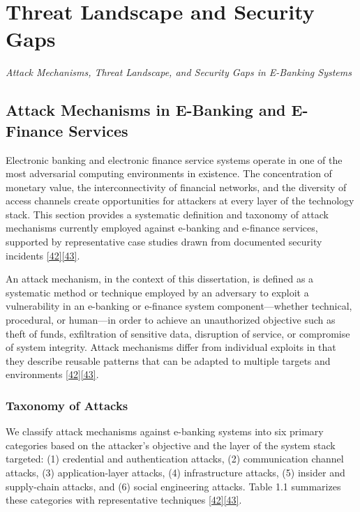 \chapter{Threat Landscape and Security Gaps}
\label{ch:chapter01}

\noindent\textit{Attack Mechanisms, Threat Landscape, and Security Gaps in E-Banking Systems}\par\vspace{1em}

\section{Attack Mechanisms in E-Banking and E-Finance Services}

\indent Electronic banking and electronic finance service systems operate in one of the most adversarial computing environments in existence. The concentration of monetary value, the interconnectivity of financial networks, and the diversity of access channels create opportunities for attackers at every layer of the technology stack. This section provides a systematic definition and taxonomy of attack mechanisms currently employed against e-banking and e-finance services, supported by representative case studies drawn from documented security incidents \hyperref[ref:42]{[42]}\hyperref[ref:43]{[43]}.

\indent An attack mechanism, in the context of this dissertation, is defined as a systematic method or technique employed by an adversary to exploit a vulnerability in an e-banking or e-finance system component---whether technical, procedural, or human---in order to achieve an unauthorized objective such as theft of funds, exfiltration of sensitive data, disruption of service, or compromise of system integrity. Attack mechanisms differ from individual exploits in that they describe reusable patterns that can be adapted to multiple targets and environments \hyperref[ref:42]{[42]}\hyperref[ref:43]{[43]}.

\subsection{Taxonomy of Attacks}

\indent We classify attack mechanisms against e-banking systems into six primary categories based on the attacker's objective and the layer of the system stack targeted: (1) credential and authentication attacks, (2) communication channel attacks, (3) application-layer attacks, (4) infrastructure attacks, (5) insider and supply-chain attacks, and (6) social engineering attacks. Table 1.1 summarizes these categories with representative techniques \hyperref[ref:42]{[42]}\hyperref[ref:43]{[43]}.

